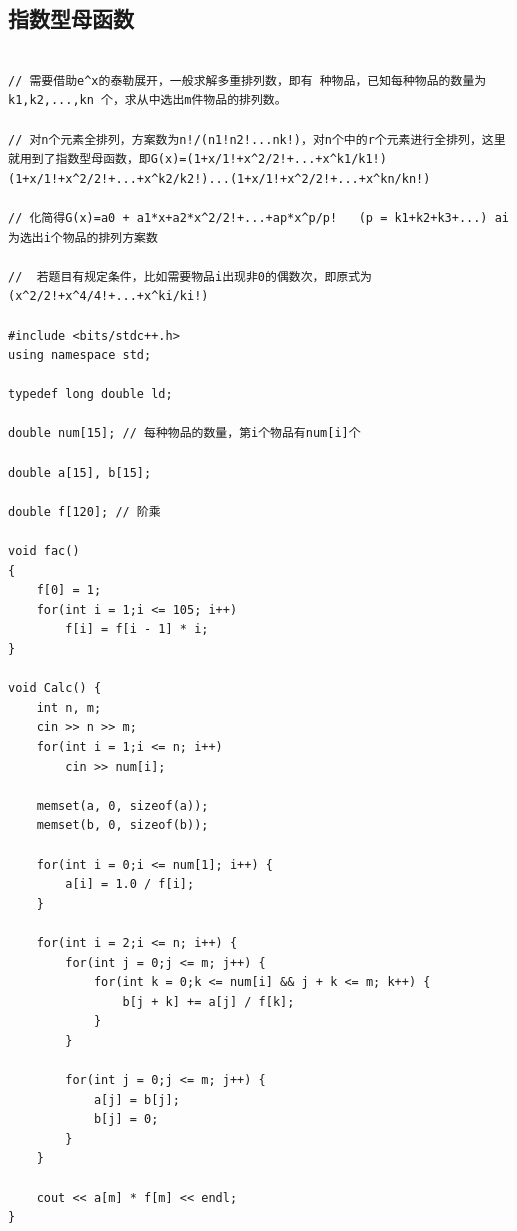 \documentclass[twoside]{article}
\begin{document}
\subsection{指数型母函数}
\begin{lstlisting}

// 需要借助e^x的泰勒展开，一般求解多重排列数，即有 种物品，已知每种物品的数量为 k1,k2,...,kn 个，求从中选出m件物品的排列数。

// 对n个元素全排列，方案数为n!/(n1!n2!...nk!)，对n个中的r个元素进行全排列，这里就用到了指数型母函数，即G(x)=(1+x/1!+x^2/2!+...+x^k1/k1!)(1+x/1!+x^2/2!+...+x^k2/k2!)...(1+x/1!+x^2/2!+...+x^kn/kn!)

// 化简得G(x)=a0 + a1*x+a2*x^2/2!+...+ap*x^p/p!   (p = k1+k2+k3+...) ai为选出i个物品的排列方案数

//  若题目有规定条件，比如需要物品i出现非0的偶数次，即原式为(x^2/2!+x^4/4!+...+x^ki/ki!) 

#include <bits/stdc++.h>
using namespace std;

typedef long double ld;

double num[15]; // 每种物品的数量，第i个物品有num[i]个

double a[15], b[15];

double f[120]; // 阶乘

void fac()
{
    f[0] = 1;
    for(int i = 1;i <= 105; i++)
        f[i] = f[i - 1] * i;
}

void Calc() {
    int n, m;
    cin >> n >> m;
    for(int i = 1;i <= n; i++)
        cin >> num[i];

    memset(a, 0, sizeof(a));
    memset(b, 0, sizeof(b));

    for(int i = 0;i <= num[1]; i++) {
        a[i] = 1.0 / f[i];
    }

    for(int i = 2;i <= n; i++) {
        for(int j = 0;j <= m; j++) {
            for(int k = 0;k <= num[i] && j + k <= m; k++) {
                b[j + k] += a[j] / f[k];
            }
        }

        for(int j = 0;j <= m; j++) {
            a[j] = b[j];
            b[j] = 0;
        }
    }

    cout << a[m] * f[m] << endl;
}\end{lstlisting}
\end{document}
